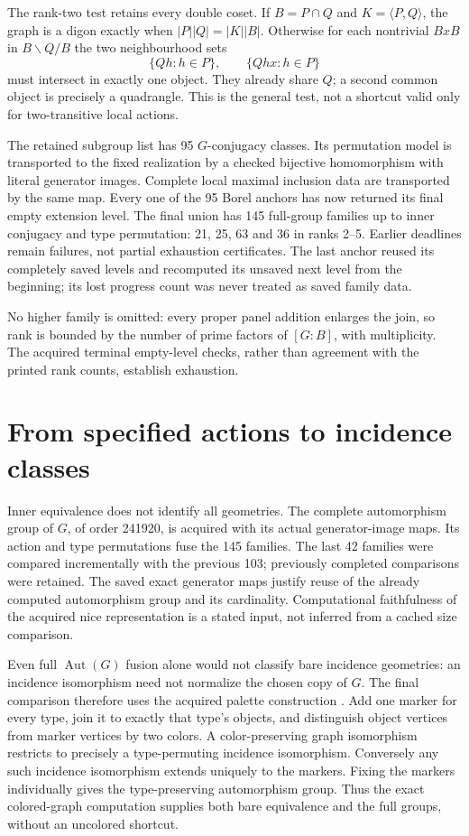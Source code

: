 \documentclass[11pt]{article}
\newcommand{\Aut}{\operatorname{Aut}}\newcommand{\Cor}{\operatorname{Cor}}
\begin{document}
The rank-two test retains every double coset. If $B=P\cap Q$ and
$K=\langle P,Q\rangle$, the graph is a digon exactly when
$|P||Q|=|K||B|$. Otherwise for each nontrivial $BxB$ in $B\backslash Q/B$
the two neighbourhood sets
\[
 \{Qh:h\in P\},\qquad \{Qhx:h\in P\}
\]
must intersect in exactly one object. They already share $Q$; a second
common object is precisely a quadrangle. This is the general test,
not a shortcut valid only for two-transitive local actions.

The retained subgroup list has 95 $G$-conjugacy classes. Its permutation
model is transported to the fixed realization by a checked bijective
homomorphism with literal generator images. Complete local maximal
inclusion data are transported by the same map. Every one of the 95
Borel anchors has now returned its final empty extension level.
The final union has 145 full-group families up to inner conjugacy and
type permutation: 21, 25, 63 and 36 in ranks 2--5. Earlier deadlines
remain failures, not partial exhaustion certificates. The last anchor
reused its completely saved levels and recomputed its unsaved next
level from the beginning; its lost progress count was never treated
as saved family data.

No higher family is omitted: every proper panel addition enlarges the
join, so rank is bounded by the number of prime factors of $[G:B]$,
with multiplicity. The acquired terminal empty-level checks, rather
than agreement with the printed rank counts, establish exhaustion.

\section{From specified actions to incidence classes}\label{fusion}
Inner equivalence does not identify all geometries. The complete
automorphism group of $G$, of order 241920, is acquired with its actual
generator-image maps. Its action and type permutations fuse the 145
families. The last 42 families were compared incrementally with the
previous 103; previously completed comparisons were retained. The
saved exact generator maps justify reuse of the already computed
automorphism group and its cardinality. Computational faithfulness of
the acquired nice representation is a stated input, not inferred from
a cached size comparison.

Even full $\Aut(G)$ fusion alone would not classify bare incidence
geometries: an incidence isomorphism need not normalize the chosen
copy of $G$. The final comparison therefore uses the acquired palette
construction \cite{Palette}. Add one marker for every type, join it
to exactly that type's objects, and distinguish object vertices from
marker vertices by two colors. A color-preserving graph isomorphism
restricts to precisely a type-permuting incidence isomorphism.
Conversely any such incidence isomorphism extends uniquely to the
markers. Fixing the markers individually gives the type-preserving
automorphism group. Thus the exact colored-graph computation supplies
both bare equivalence and the full groups, without an uncolored shortcut.
\end{document}
